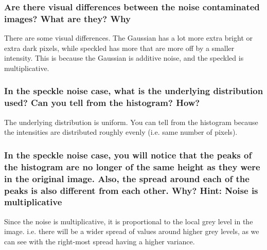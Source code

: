 \subsubsection{Are there visual differences between the noise contaminated images? What are they? Why}
There are some visual differences. The Gaussian has a lot more extra bright or extra dark pixels, while speckled has more that are more off by a smaller intensity. This is because the Gaussian is additive noise, and the speckled is multiplicative.

\subsubsection{In the speckle noise case, what is the underlying distribution used? Can you tell from the histogram?
How?}
The underlying distribution is uniform. You can tell from the histogram because the intensities are distributed roughly evenly (i.e. same number of pixels). 

\subsubsection{In the speckle noise case, you will notice that the peaks of the histogram are no longer of the same
height as they were in the original image. Also, the spread around each of the peaks is also different
from each other. Why? Hint: Noise is multiplicative}
Since the noise is multiplicative, it is proportional to the local grey level in the image. i.e. there will be a wider spread of values around higher grey levels, as we can see with the right-most spread having a higher variance.
